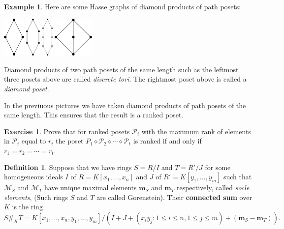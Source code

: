\documentclass[11pt]{amsart}
\newcommand{\M}{{\mathcal M}}
\renewcommand{\P}{{\mathcal P}}
\def\bm{\mathbf{m}}
\newcommand{\di}{\diamond}
\theoremstyle{plain} %
\theoremstyle{definition}
\newtheorem{defn}[thm]{Definition}
\newtheorem{ex}[thm]{Example}
\newtheorem{exer}[thm]{Exercise}
\theoremstyle{remark}
\numberwithin{equation}{section}  %
\begin{document}
\begin{ex}\label{ex: diamond}\label{ex: tori diamond}
Here are some Hasse graphs of diamond products of path posets:
\begin{center}
\includegraphics[height=2cm]{Pictures/Torus_4.pdf}
\quad 
\includegraphics[height=2cm]{Pictures/Torus_6.pdf}
\quad
\includegraphics[height=2cm]{Pictures/Torus_8.pdf}
\quad
\includegraphics[height=2cm]{Pictures/Diamond.pdf}
\end{center}
Diamond products of two path posets of the same length such as the leftmost three posets above are called {\em discrete tori}. The rightmost poset above is called a {\em diamond poset}.
\end{ex}

In the previuous pictures we have taken diamond products of path posets of the same length. This ensures that the result is a ranked poset.
\begin{tcolorbox}[reset]
\begin{exer}
Prove that for ranked posets $\P_i$ with the maximum rank of elements in $\P_i$ equal to $r_i$ the poset $P_1\di \P_2 \di \cdots \di  \P_t$ is ranked if and only if $r_1=r_2=\cdots=r_t$.
\end{exer}
\end{tcolorbox}


\begin{tcolorbox}
\begin{defn}
Suppose that we have rings $S = R/I$  and $T=R'/J$ for some homogeneous ideals $I$ of $R = K[x_1,\ldots, x_n]$ and $J$ of $R'=K[y_1, \ldots, y_m]$ such that $\M_S$ and $\M_T$ have unique maximal elements $\bm_S$ and $\bm_T$ respectively, called {\em socle elements}, (Such rings $S$ and $T$ are called Gorenstein). Their  {\bf connected sum} over $K$ is the ring
\[
S\#_K T= K[x_1,\ldots, x_n, y_1, \ldots, y_m]/ (I +J + (x_iy_j: 1\leq i\leq n, 1\leq j\leq m)+(\bm_S-\bm_T)).
\]
\end{defn}
\end{tcolorbox}
\end{document}
